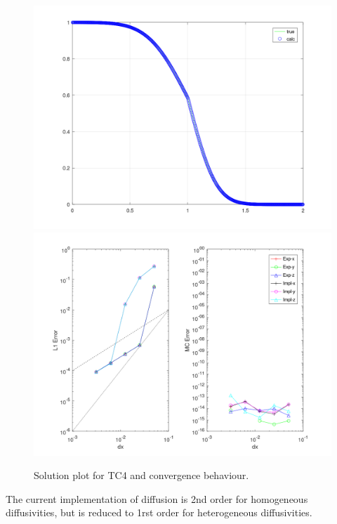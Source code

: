\begin{figure}[htbp]\vspace*{0cm}\hspace*{0cm}
\includegraphics[angle=0,scale=0.3]{Figures/Apx_Test/TC4_XY_Solution_Sub1.png}
\includegraphics[angle=0,scale=0.3]{Figures/Apx_Test/TC4_XY.png}
\parbox{15cm}{\caption{\label{FigTest_ConvTC4}
Solution plot for TC4 and convergence behaviour.
}}
\end{figure}
The current implementation of diffusion is 2nd order for homogeneous diffusivities, but
is reduced to 1rst order for heterogeneous diffusivities.


